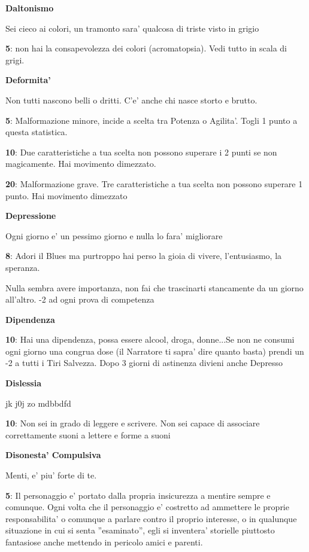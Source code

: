 \documentclass[a4paper,11pt,twoside,openany]{book}
\begin{document}
{		\textbf{Daltonismo}
		
		Sei cieco ai colori, un tramonto sara' qualcosa di triste visto in grigio
		
		\textbf{5}: non hai la consapevolezza dei colori (acromatopsia). Vedi tutto in scala di grigi.
		
		\textbf{Deformita'}
		
		Non tutti nascono belli o dritti. C'e' anche chi nasce storto e brutto.
		
		\textbf{5}: Malformazione minore, incide a scelta tra Potenza o Agilita'. Togli 1 punto a questa statistica.
		
		\textbf{10}: Due caratteristiche a tua scelta non possono superare i 2 punti se non magicamente. Hai movimento dimezzato.
		
		\textbf{20}: Malformazione grave. Tre caratteristiche a tua scelta non possono superare 1 punto. Hai movimento dimezzato
		
		\textbf{Depressione}
		
		Ogni giorno e' un pessimo giorno e nulla lo fara' migliorare
		
		\textbf{8}: Adori il Blues ma purtroppo hai perso la gioia di vivere, l'entusiasmo, la speranza.
		
		Nulla sembra avere importanza, non fai che trascinarti stancamente da un giorno all'altro. -2 ad ogni prova di competenza
		
		\textbf{Dipendenza}
		
		\textbf{10}: Hai una dipendenza, possa essere alcool, droga, donne...Se non ne consumi ogni giorno una congrua dose (il Narratore ti sapra' dire quanto basta) prendi un -2 a tutti i Tiri Salvezza. Dopo 3 giorni di astinenza divieni anche Depresso
		
		\textbf{Dislessia}
		
		jk j0j zo mdbbdfd
		
		\textbf{10}: Non sei in grado di leggere e scrivere. Non sei capace di associare correttamente suoni a lettere e forme a suoni
		
		\textbf{Disonesta' Compulsiva}
		
		Menti, e' piu' forte di te.
		
		\textbf{5}: Il personaggio e' portato dalla propria insicurezza a mentire sempre e comunque. Ogni volta che il personaggio e' costretto ad ammettere le proprie responsabilita' o comunque a parlare contro il proprio interesse, o in qualunque situazione in cui si senta ''esaminato'', egli si inventera' storielle piuttosto fantasiose anche mettendo in pericolo amici e parenti.
		
}
\end{document}
